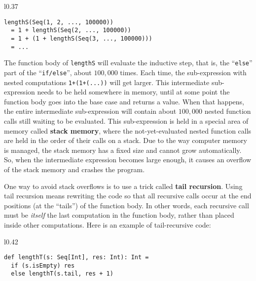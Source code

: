 \begin{wrapfigure}{l}{0.37\columnwidth}%
\vspace{-1\baselineskip}
\begin{lstlisting}
lengthS(Seq(1, 2, ..., 100000))
  = 1 + lengthS(Seq(2, ..., 100000))
  = 1 + (1 + lengthS(Seq(3, ..., 100000)))
  = ...
\end{lstlisting}

\vspace{-1.5\baselineskip}
\end{wrapfigure}%

\noindent The function body of \lstinline!lengthS! will evaluate
the inductive step, that is, the \textsf{``}\lstinline!else!\textsf{''} part of the
\textsf{``}\lstinline!if/else!\textsf{''}, about $100,000$ times. Each time, the
sub-expression with nested computations \lstinline!1+(1+(...))! will
get larger. This intermediate sub-expression needs to be held somewhere
in memory, until at some point the function body goes into the base
case and returns a value. When that happens, the entire intermediate
sub-expression will contain about $100,000$ nested function calls
still waiting to be evaluated. This sub-expression is held in a special
area of memory called \textbf{stack memory},
where the not-yet-evaluated nested function calls are held in the
order of their calls on a stack. Due to the way computer memory is
managed, the stack memory has a fixed size and cannot grow automatically.
So, when the intermediate expression becomes large enough, it causes
an overflow of the stack memory and crashes the program.

One way to avoid stack overflows is to use a trick called \textbf{tail
recursion}. Using tail recursion means rewriting
the code so that all recursive calls occur at the end positions (at
the \textsf{``}tails\textsf{''}) of the function body. In other words, each recursive
call must be \emph{itself} the last computation in the function body,
rather than placed inside other computations. Here is an example of
tail-recursive code:

\begin{wrapfigure}{l}{0.42\columnwidth}%
\vspace{-1.1\baselineskip}
\begin{lstlisting}
def lengthT(s: Seq[Int], res: Int): Int =
  if (s.isEmpty) res
  else lengthT(s.tail, res + 1)
\end{lstlisting}

\vspace{-1.5\baselineskip}
\end{wrapfigure}%

